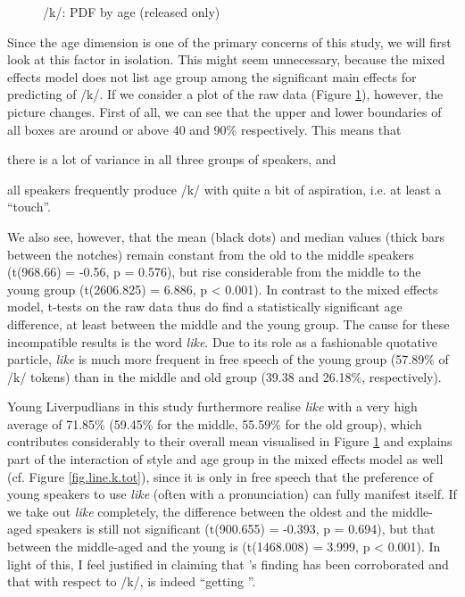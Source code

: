 \begin{figure}[h]
	\centering
		\resizebox{0.5\linewidth}{!}{} 
	\caption{/k/: PDF by age (released only)}
	\label{fig.box.k.tot}
\end{figure}

Since the age dimension is one of the primary concerns of this study, we will first look at this factor in isolation.
This might seem unnecessary, because the mixed effects model does not list age group among the significant main effects for predicting  of /k/.
If we consider a plot of the raw data (Figure \ref{fig.box.k.tot}), however, the picture changes.
First of all, we can see that the upper and lower boundaries of all boxes are around or above 40 and 90\% respectively.
This means that
\begin{inparaenum}[(a)]
	\item there is a lot of variance in all three groups of speakers, and
	\item all speakers frequently produce /k/ with quite a bit of aspiration, i.e. at least a  ``touch''.
\end{inparaenum}
We also see, however, that the mean (black dots) and median values (thick bars between the notches) remain constant from the old to the middle speakers (t(968.66) = -0.56, p = 0.576), but rise considerable from the middle to the young group (t(2606.825) = 6.886, p < 0.001).
In contrast to the mixed effects model, t-tests on the raw data thus do find a statistically significant age difference, at least between the middle and the young group.
The cause for these incompatible results is the word \emph{like}.
Due to its role as a fashionable quotative particle, \emph{like} is much more frequent in free speech of the young group (57.89\% of /k/ tokens) than in the middle and old group (39.38 and 26.18\%, respectively).

Young Liverpudlians in this study furthermore realise \emph{like} with a very high average  of 71.85\% (59.45\% for the middle, 55.59\% for the old group), which contributes considerably to their overall mean visualised in Figure \ref{fig.box.k.tot} and explains part of the interaction of style and age group in the mixed effects model as well (cf. Figure \ref{fig.line.k.tot}), since it is only in free speech that the preference of young speakers to use \emph{like} (often with a  pronunciation) can fully manifest itself.
If we take out \emph{like} completely, the difference between the oldest and the middle-aged speakers is still not significant (t(900.655) = -0.393, p = 0.694), but that between the middle-aged and the young is (t(1468.008) = 3.999, p < 0.001).
In light of this, I feel justified in claiming that \textcite{watson2007a}'s finding has been corroborated and that with respect to /k/,  is indeed ``getting ''.

